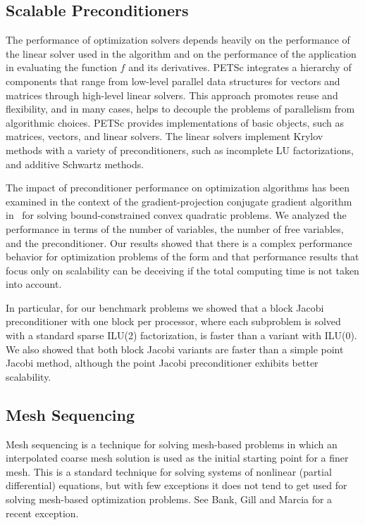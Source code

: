 \subsection{Scalable Preconditioners}

The performance of optimization solvers depends heavily on
the performance of the linear solver used in the algorithm
and on the performance of the application in evaluating the
function $f$ and its derivatives.  PETSc
\cite{PETSc-manual,petsc-home} integrates a hierarchy of
components that range from low-level parallel data
structures for vectors and matrices through high-level
linear solvers.  This approach promotes reuse and
flexibility, and in many cases, helps to decouple the problems
of parallelism from algorithmic choices.  PETSc provides
implementations of basic objects, such as matrices,
vectors, and linear solvers.  The linear solvers implement Krylov
methods with a variety of preconditioners, such as
incomplete LU factorizations, and additive Schwartz methods.

The impact of preconditioner performance on optimization
algorithms has been examined \cite{SB99} in the
context of the gradient-projection conjugate gradient
algorithm in \tao\ for solving bound-constrained convex
quadratic problems.  We analyzed the performance in terms of
the number of variables, the number of free variables, and
the preconditioner. Our results showed that there is a
complex performance behavior for optimization problems of
the form  and that performance results that
focus only on scalability can be deceiving if the total
computing time is not taken into account.

In particular, for our benchmark problems we showed that a
block Jacobi preconditioner with one block per processor,
where each subproblem is solved with a standard sparse
ILU(2) factorization, is faster than a variant with ILU(0).
We also showed that both block Jacobi variants are faster
than a simple point Jacobi method, although the point Jacobi
preconditioner exhibits better scalability.


\subsection{Mesh Sequencing}

Mesh sequencing is a technique for solving mesh-based
problems in which an interpolated coarse mesh solution is used
as the initial starting point for a finer mesh.  This is a
standard technique for solving systems of nonlinear (partial
differential) equations, but with few exceptions it does not
tend to get used for solving mesh-based optimization
problems.  See Bank, Gill and Marcia \cite{REB01} for a
recent exception.

